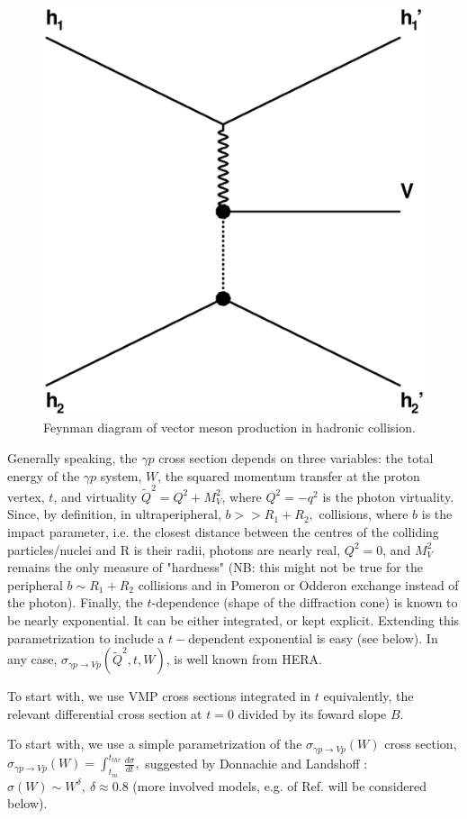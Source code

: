 \documentclass[12pt]{article}
\begin{document}
\begin{figure}[!h]
\centering
 \includegraphics[width=.4\textwidth]{figures/exclusive_vmp.eps}
 \caption{Feynman diagram of vector meson production in hadronic collision.}
 \label{fig:vmp_feynman}
\end{figure}

Generally speaking, the $\gamma p$ cross section depends on three variables: the total energy of the $\gamma p$ system, $W$,
the squared momentum transfer at the proton vertex, $t$, and virtuality $\tilde Q^2=Q^2+M_V^2$, where $Q^2=-q^2$ is the photon virtuality. Since, by definition, in ultraperipheral, $b>>R_1+R_2,$
collisions, where $b$ is the impact parameter, i.e. the closest distance between the centres of the colliding particles/nuclei and R is their radii,
photons are nearly real, $Q^2=0$, and $M_V^2$ remains the only measure of "hardness" (NB: this might not be true for the peripheral $b\sim R_1+R_2$ collisions and in
Pomeron or Odderon exchange instead of the photon). Finally, the $t$-dependence (shape of the diffraction cone) is known to be nearly exponential. It can be either integrated, or
kept explicit. Extending this parametrization to include a $t-$dependent exponential is easy (see below).
In any case, $\sigma_{\gamma p\rightarrow Vp}(\tilde Q^2, t, W)$, is well known from HERA.

To start with, we use VMP cross sections integrated in $t$ equivalently, the relevant differential cross section
at $t=0$ divided by its foward slope $B$.


To start with, we use a simple parametrization of the $\sigma_{\gamma p\rightarrow Vp}(W)$ cross section, $\sigma_{\gamma p\rightarrow Vp}(W)=\int_{t_m}^{t_{thr}}\frac{d\sigma}{dt},$
suggested by Donnachie and Landshoff \cite{DL}: $\sigma(W)\sim W^{\delta},\ \delta\approx 0.8$ (more involved models, e.g. of Ref. \cite{Capua, Fazio} will be considered below).
\end{document}
